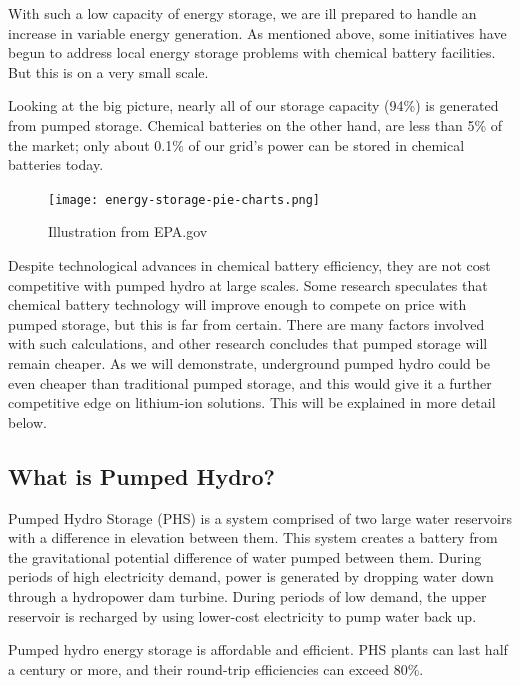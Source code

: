 \documentclass[hidelinks,12pt,a4paper]{article}
\begin{document}
With such a low capacity of energy storage, we are ill prepared to handle an increase in variable energy generation. As mentioned above, some initiatives have begun to address local energy storage problems with chemical battery facilities. But this is on a very small scale.

Looking at the big picture, nearly all of our storage capacity (94\%) is generated from pumped storage. \cite{ElectricStorageCapacityInTheUnitedStates} Chemical batteries on the other hand, are less than 5\% of the market; only about 0.1\% of our grid's power can be stored in chemical batteries today.

\begin{figure}[ht!]
    \centering
    \texttt{[image: energy-storage-pie-charts.png]}
    \caption{Illustration from EPA.gov \cite{ElectricStorageCapacityInTheUnitedStates}}
\end{figure}
\FloatBarrier

Despite technological advances in chemical battery efficiency, they are not cost competitive with pumped hydro at large scales. Some research speculates that chemical battery technology will improve enough to compete on price with pumped storage\cite{ProjectingTheFutureLevelizedCostOfElectricityStorageTechnologies}, but this is far from certain. There are many factors involved with such calculations, and other research concludes that pumped storage will remain cheaper. \cite{PumpedEnergyStorageVitalToCalifornia} As we will demonstrate, underground pumped hydro could be even cheaper than traditional pumped storage, and this would give it a further competitive edge on lithium-ion solutions. This will be explained in more detail below.

\subsection{What is Pumped Hydro?}
Pumped Hydro Storage (PHS) is a system comprised of two large water reservoirs with a difference in elevation between them. This system creates a battery from the gravitational potential difference of water pumped between them. During periods of high electricity demand, power is generated by dropping water down through a hydropower dam turbine. During periods of low demand, the upper reservoir is recharged by using lower-cost electricity to pump water back up.

Pumped hydro energy storage is affordable and efficient. PHS plants can last half a century or more, and their round-trip efficiencies can exceed 80\%. \cite{USGridEnergyStorageFactsheet}
\end{document}
